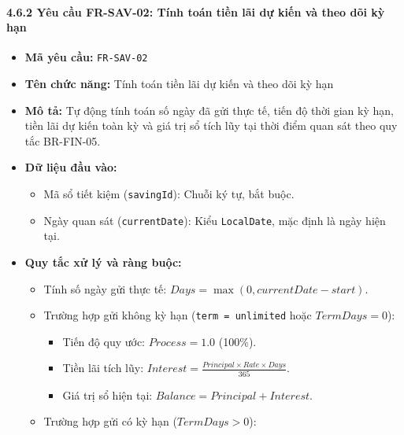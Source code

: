 \documentclass[11pt,a4paper]{article}
\providecommand{\tightlist}{
  \setlength{\itemsep}{0pt}\setlength{\parskip}{0pt}}
\begin{document}
\newpage

\paragraph{4.6.2 Yêu cầu FR-SAV-02: Tính toán tiền lãi dự kiến và theo
dõi kỳ
hạn}\label{462-yuxeau-cux1ea7u-fr-sav-02-tuxednh-touxe1n-tiux1ec1n-luxe3i-dux1ef1-kiux1ebfn-vuxe0-theo-duxf5i-kux1ef3-hux1ea1n}

\begin{itemize}
\tightlist
\item
  \textbf{Mã yêu cầu:} \texttt{FR-SAV-02}
\item
  \textbf{Tên chức năng:} Tính toán tiền lãi dự kiến và theo dõi kỳ hạn
\item
  \textbf{Mô tả:} Tự động tính toán số ngày đã gửi thực tế, tiến độ thời
  gian kỳ hạn, tiền lãi dự kiến toàn kỳ và giá trị sổ tích lũy tại thời
  điểm quan sát theo quy tắc BR-FIN-05.
\item
  \textbf{Dữ liệu đầu vào:}

  \begin{itemize}
  \tightlist
  \item
    Mã sổ tiết kiệm (\texttt{savingId}): Chuỗi ký tự, bắt buộc.
  \item
    Ngày quan sát (\texttt{currentDate}): Kiểu \texttt{LocalDate}, mặc
    định là ngày hiện tại.
  \end{itemize}
\item
  \textbf{Quy tắc xử lý và ràng buộc:}

  \begin{itemize}
  \tightlist
  \item
    Tính số ngày gửi thực tế: \(Days = \max(0, currentDate - start)\).
  \item
    Trường hợp gửi không kỳ hạn (\texttt{term\ =\ unlimited} hoặc
    \(TermDays = 0\)):

    \begin{itemize}
    \tightlist
    \item
      Tiến độ quy ước: \(Process = 1.0\) (100\%).
    \item
      Tiền lãi tích lũy:
      \(Interest = \frac{Principal \times Rate \times Days}{365}\).
    \item
      Giá trị sổ hiện tại: \(Balance = Principal + Interest\).
    \end{itemize}
  \item
    Trường hợp gửi có kỳ hạn (\(TermDays > 0\)):


\end{itemize}
\end{itemize}
\end{document}
